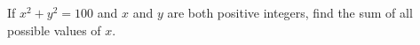 If $x^2+y^2=100$ and $x$ and $y$ are both positive integers, find the sum of all possible values of $x$.
